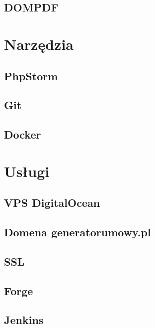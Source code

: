 \documentclass[12pt]{report}
\begin{document}
            \subsection{DOMPDF}
                
        \section{Narzędzia}
            \subsection{PhpStorm}
                
            \subsection{Git}
                
            \subsection{Docker}
                
        \section{Usługi}
            \subsection{VPS DigitalOcean}
                
            \subsection{Domena generatorumowy.pl}
                
            \subsection{SSL}
                
            \subsection{Forge}
                
            \subsection{Jenkins}
                
\end{document}
